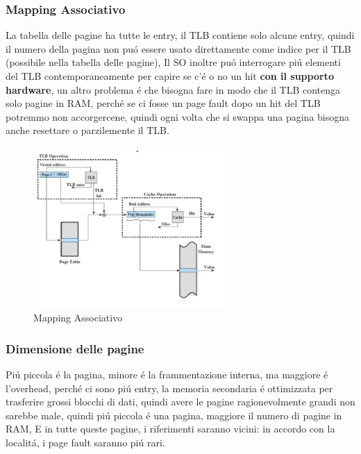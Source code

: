     \subsubsection*{Mapping Associativo}
    La tabella delle pagine ha tutte le entry, il TLB contiene solo alcune entry, quindi il numero della pagina non puó essere
    usato direttamente come indice per il TLB (possibile nella tabella delle pagine), Il SO inoltre puó interrogare piú
    elementi del TLB contemporaneamente per capire se c'é o no un hit \textbf{con il supporto hardware}, un altro
    problema é che bisogna fare in modo che il TLB contenga solo pagine in RAM, perché se ci fosse un page fault dopo
    un hit del TLB potremmo non accorgercene, quindi ogni volta che si swappa una pagina bisogna anche resettare o parzilemente il
    TLB.
    \begin{figure}[H]
        \centering
        \includegraphics[width=0.65\textwidth]{immagini/TLBeCache}
        \caption{Mapping Associativo}
    \end{figure}
    \subsubsection{Dimensione delle pagine}
    Piú piccola é la pagina, minore é la frammentazione interna, ma maggiore é l'overhead, perché ci sono piú entry,
    la memoria secondaria é ottimizzata per trasferire grossi blocchi di dati, quindi avere le pagine ragionevolmente grandi
    non sarebbe male, quindi piú piccola é una pagina, maggiore il numero di pagine in RAM, E in tutte queste pagine, i riferimenti
    saranno vicini: in accordo con la localitá, i page fault saranno piú rari.

